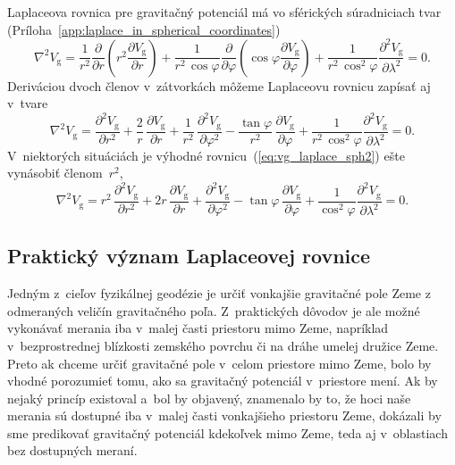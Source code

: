 \documentclass[a4paper,12pt]{book}
\newcommand{\gidx}{\mathrm g}
\begin{document}
Laplaceova rovnica pre gravitačný potenciál má vo sférických súradniciach tvar 
(Príloha~\ref{app:laplace_in_spherical_coordinates})
%
\begin{equation}
\label{eq:vg_laplace_sph}
\nabla^2 V_\gidx = \frac{1}{r^2} \frac{\partial}{\partial r} \left( r^2
\frac{\partial V_\gidx}{\partial r} \right) + \frac{1}{r^2 \, \cos\varphi}
\frac{\partial}{\partial \varphi} \left( \cos\varphi \frac{\partial
V_\gidx}{\partial \varphi} \right) + \frac{1}{r^2 \,
\cos^2\varphi}\frac{\partial^2 V_\gidx}{\partial \lambda^2} = 0{.}
\end{equation}
%
Deriváciou dvoch členov v~zátvorkách môžeme Laplaceovu rovnicu zapísať aj 
v~tvare
%
\begin{equation}
\label{eq:vg_laplace_sph2}
\nabla^2 V_\gidx = \frac{\partial^2 V_\gidx}{\partial r^2} + \frac{2}{r} \, 
\frac{\partial V_\gidx}{\partial r} + \frac{1}{r^2} \, \frac{\partial^2 
V_\gidx}{\partial \varphi^2} - \frac{\tan\varphi}{r^2} \, \frac{\partial 
V_\gidx}{\partial \varphi} + \frac{1}{r^2 \,
\cos^2\varphi}\frac{\partial^2 V_\gidx}{\partial \lambda^2} = 0{.}
\end{equation}
%
V~niektorých situáciách je výhodné rovnicu~(\ref{eq:vg_laplace_sph2}) ešte 
vynásobiť členom~$r^2$,
%
\begin{equation}
\label{eq:vg_laplace_sph3}
\nabla^2 V_\gidx = r^2 \, \frac{\partial^2 V_\gidx}{\partial r^2} + 2r \, 
\frac{\partial V_\gidx}{\partial r} + \frac{\partial^2 V_\gidx}{\partial 
\varphi^2} - \tan\varphi \, \frac{\partial V_\gidx}{\partial \varphi} 
+ \frac{1}{\cos^2\varphi}\frac{\partial^2 V_\gidx}{\partial \lambda^2} = 0{.}
\end{equation}


\subsection{Praktický význam Laplaceovej rovnice}
\label{sec:meaning_of_laplace_equation_in_practice}

Jedným z~cieľov fyzikálnej geodézie je určiť vonkajšie gravitačné pole Zeme 
z odmeraných veličín gravitačného poľa.  Z~praktických dôvodov je ale možné 
vykonávať merania iba v~malej časti priestoru mimo Zeme, napríklad 
v~bezprostrednej blízkosti zemského povrchu či na dráhe umelej družice Zeme.  
Preto ak chceme určiť gravitačné pole v~celom priestore mimo Zeme, bolo by 
vhodné porozumieť tomu, ako sa gravitačný potenciál v~priestore mení.  Ak by 
nejaký princíp existoval a~bol by objavený, znamenalo by to, že hoci naše 
merania sú dostupné iba v~malej časti vonkajšieho priestoru Zeme, dokázali by 
sme predikovať gravitačný potenciál kdekoľvek mimo Zeme, teda aj v~oblastiach 
bez dostupných meraní.
\end{document}
